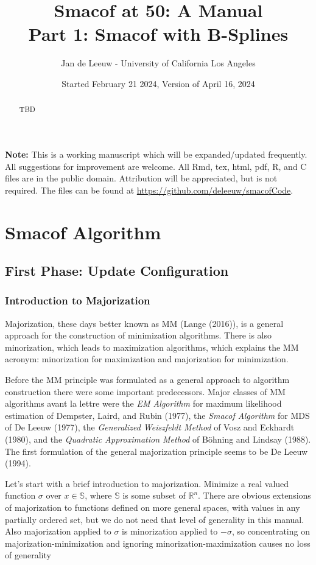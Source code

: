 \documentclass[
  12pt,
]{article}
\title{Smacof at 50: A Manual\\
Part 1: Smacof with B-Splines}
\author{Jan de Leeuw - University of California Los Angeles}
\date{Started February 21 2024, Version of April 16, 2024}
\newcommand{\sectionbreak}{\clearpage}
\begin{document}
\maketitle
\begin{abstract}
TBD
\end{abstract}

{
\setcounter{tocdepth}{4}
\tableofcontents
}
\textbf{Note:} This is a working manuscript which will be expanded/updated
frequently. All suggestions for improvement are welcome. All Rmd, tex,
html, pdf, R, and C files are in the public domain. Attribution will be
appreciated, but is not required. The files can be found at
\url{https://github.com/deleeuw/smacofCode}.

\sectionbreak

\section{Smacof Algorithm}\label{smacof-algorithm}

\subsection{First Phase: Update Configuration}\label{first-phase-update-configuration}

\subsubsection{Introduction to Majorization}\label{introduction-to-majorization}

Majorization, these days better known as MM (Lange (2016)), is a general
approach for the construction of minimization algorithms. There is also
minorization, which leads to maximization algorithms, which explains the
MM acronym: minorization for maximization and majorization for
minimization.

Before the MM principle was formulated as a general approach to
algorithm construction there were some important predecessors. Major
classes of MM algorithms avant la lettre were the \emph{EM Algorithm} for
maximum likelihood estimation of Dempster, Laird, and Rubin (1977), the \emph{Smacof
Algorithm} for MDS of De Leeuw (1977), the \emph{Generalized Weiszfeldt Method}
of Vosz and Eckhardt (1980), and the \emph{Quadratic Approximation Method} of
Böhning and Lindsay (1988). The first formulation of the general majorization
principle seems to be De Leeuw (1994).

Let's start with a brief introduction to majorization. Minimize a real
valued function \(\sigma\) over \(x\in\mathbb{S}\), where \(\mathbb{S}\) is
some subset of \(\mathbb{R}^n\). There are obvious extensions of
majorization to functions defined on more general spaces, with values in
any partially ordered set, but we do not need that level of generality
in this manual. Also majorization applied to \(\sigma\) is minorization
applied to \(-\sigma\), so concentrating on majorization-minimization and
ignoring minorization-maximization causes no loss of generality
\end{document}
